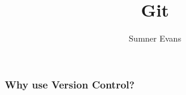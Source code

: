 \documentclass{lug}
\title{Git}
\author{Sumner Evans}
\begin{document}
\begin{frame}
    \frametitle{Why use Version Control?}

\end{frame}







\end{document}

